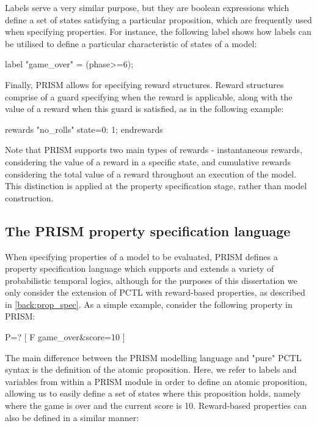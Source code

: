 Labels serve a very similar purpose, but they are boolean expressions which define a set of states satisfying a particular proposition, which are frequently used when specifying properties. For instance, the following label shows how labels can be utilised to define a particular characteristic of states of a model:

\begin{verbatim*}
    label "game_over" = (phase>=6);
\end{verbatim*}

Finally, PRISM allows for specifying reward structures. Reward structures comprise of a guard specifying when the reward is applicable, along with the value of a reward when this guard is satisfied, as in the following example:


\begin{verbatim*}
    rewards "no_rolls"
        state=0: 1;
    endrewards
\end{verbatim*}

Note that PRISM supports two main types of rewards - instantaneous rewards, considering the value of a reward in a specific state, and cumulative rewards considering the total value of a reward throughout an execution of the model. This distinction is applied at the property specification stage, rather than model construction.

\subsection{The PRISM property specification language}
\label{back:PRISM-prop}

When specifying properties of a model to be evaluated, PRISM defines a property specification language which supports and extends a variety of probabilistic temporal logics, although for the purposes of this dissertation we only consider the extension of PCTL with reward-based properties, as described in \ref{back:prop_spec}. As a simple example, consider the following property in PRISM:

\begin{verbatim*}
    P=? [ F game_over&score=10 ]
\end{verbatim*}

The main difference between the PRISM modelling language and "pure" PCTL syntax is the definition of the atomic proposition. Here, we refer to labels and variables from within a PRISM module in order to define an atomic proposition, allowing us to easily define a set of states where this proposition holds, namely where the game is over and the current score is 10. Reward-based properties can also be defined in a similar manner:

